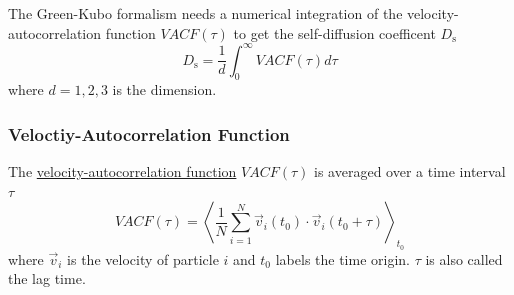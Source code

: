 \documentclass[
  letterpaper,
]{article}
\begin{document}

The Green-Kubo formalism needs a numerical integration of the
velocity-autocorrelation function \(VACF(\tau)\) to get the
self-diffusion coefficent \(D_{\mathrm{s}}\) \[
D_{\mathrm{s}} = \frac{1}{d} \int _{0}^{\infty} VACF(\tau)  d\tau
\] where \(d=1,2,3\) is the dimension.

\hypertarget{veloctiy-autocorrelation-function}{%
\subsubsection{Veloctiy-Autocorrelation
Function}\label{veloctiy-autocorrelation-function}}

The \href{}{velocity-autocorrelation function} \(VACF(\tau)\) is
averaged over a time interval \(\tau\) \[
VACF(\tau) = \left < \frac{1}{N} \sum_{i=1}^{N} \vec{v} _{i}(t_0) \cdot \vec{v} _{i}(t_0 + \tau) \right >_{t_0}
\] where \(\vec{v}_{i}\) is the velocity of particle \(i\) and \(t_0\)
labels the time origin. \(\tau\) is also called the lag time.
\end{document}
